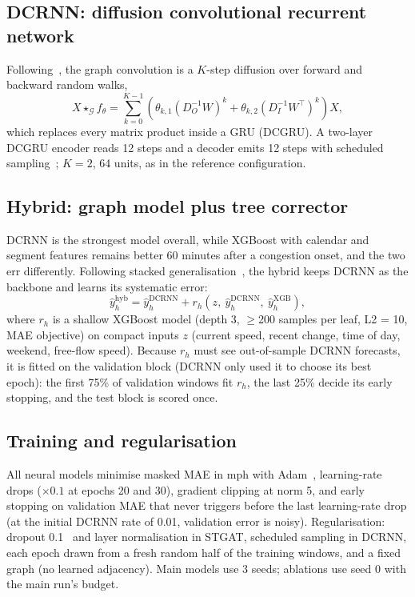 \documentclass[conference]{IEEEtran}
\begin{document}
\subsection{DCRNN: diffusion convolutional recurrent network}
Following~\cite{li2018dcrnn}, the graph convolution is a $K$-step diffusion over forward and backward random walks,
\begin{equation}
X\star_{\mathcal G} f_\theta=\sum_{k=0}^{K-1}\left(\theta_{k,1}(D_O^{-1}W)^k+\theta_{k,2}(D_I^{-1}W^{\top})^k\right)X,
\end{equation}
which replaces every matrix product inside a GRU (DCGRU). A two-layer DCGRU encoder reads 12 steps and a decoder emits
12 steps with scheduled sampling~\cite{bengio2015scheduled}; $K=2$, 64 units, as in the reference configuration.

\subsection{Hybrid: graph model plus tree corrector}
DCRNN is the strongest model overall, while XGBoost with calendar and segment features remains better 60 minutes after
a congestion onset, and the two err differently. Following stacked generalisation~\cite{wolpert1992stacking}, the hybrid
keeps DCRNN as the backbone and learns its systematic error:
\begin{equation}
\hat y^{\text{hyb}}_{h}=\hat y^{\text{DCRNN}}_{h}+r_h\!\left(z,\ \hat y^{\text{DCRNN}}_{h},\ \hat y^{\text{XGB}}_{h}\right),
\end{equation}
where $r_h$ is a shallow XGBoost model (depth 3, $\ge$200 samples per leaf, L2 = 10, MAE objective) on compact inputs $z$
(current speed, recent change, time of day, weekend, free-flow speed). Because $r_h$ must see out-of-sample DCRNN
forecasts, it is fitted on the validation block (DCRNN only used it to choose its best epoch): the first 75\% of
validation windows fit $r_h$, the last 25\% decide its early stopping, and the test block is scored once.

\subsection{Training and regularisation}
All neural models minimise masked MAE in mph with Adam~\cite{kingma2015adam}, learning-rate drops ($\times0.1$ at epochs
20 and 30), gradient clipping at norm 5, and early stopping on validation MAE that never triggers before the last
learning-rate drop (at the initial DCRNN rate of 0.01, validation error is noisy). Regularisation: dropout
0.1~\cite{srivastava2014dropout} and layer normalisation in STGAT, scheduled sampling in DCRNN, each epoch drawn from a
fresh random half of the training windows, and a fixed graph (no learned adjacency). Main models use 3 seeds; ablations
use seed 0 with the main run's budget.
\end{document}
